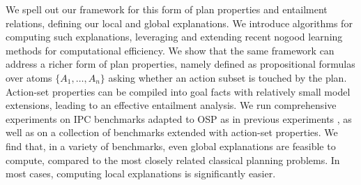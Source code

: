 We spell out our framework for this form of plan properties and
entailment relations, defining our local and global explanations. We
introduce algorithms for computing such explanations, leveraging and
extending recent nogood learning methods
\cite{steinmetz:hoffmann:ai-17,steinmetz:hoffmann:ijcai-17} for
computational efficiency. We show that the same framework can address
a richer form of plan properties, namely 
defined as propositional formulas over atoms $\{A_1, \dots, A_n\}$
asking whether an action subset is touched by the plan. Action-set
properties can be compiled into goal facts with relatively small model
extensions, leading to an effective entailment analysis. We run
comprehensive experiments on IPC benchmarks adapted to OSP as in
previous experiments \cite{domshlak:mirkis:jair-15}, as well as on a
collection of benchmarks extended with action-set properties. We find
that, in a variety of benchmarks, even global explanations are
feasible to compute, compared to the most closely related classical
planning problems. In most cases, computing local explanations is
significantly easier.





















